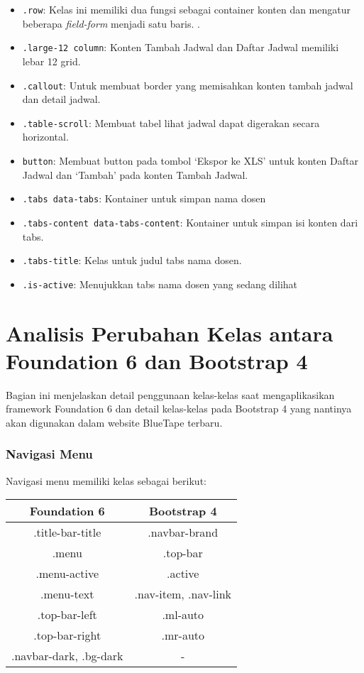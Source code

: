 \begin{itemize}
	\item \texttt{.row}: Kelas ini memiliki dua fungsi sebagai container konten dan mengatur beberapa \textit{field-form} menjadi satu baris. .
	\item \texttt{.large-12 column}: Konten Tambah Jadwal dan Daftar Jadwal memiliki lebar 12 grid.
	\item \texttt{.callout}: Untuk membuat border yang memisahkan konten tambah jadwal dan detail jadwal.
	\item \texttt{.table-scroll}: Membuat tabel lihat jadwal dapat digerakan secara horizontal.
	\item \texttt{button}: Membuat button pada tombol `Ekspor ke XLS' untuk konten Daftar Jadwal dan `Tambah' pada konten Tambah Jadwal.	
	\item \texttt{.tabs data-tabs}: Kontainer untuk simpan nama dosen
	\item \texttt{.tabs-content data-tabs-content}: Kontainer untuk simpan isi konten dari tabs.
	\item \texttt{.tabs-title}: Kelas untuk judul tabs nama dosen.
	\item \texttt{.is-active}: Menujukkan tabs nama dosen yang sedang dilihat
\end{itemize}

\section{Analisis Perubahan Kelas antara Foundation 6 dan Bootstrap 4}
Bagian ini menjelaskan detail penggunaan kelas-kelas saat mengaplikasikan framework Foundation 6 dan detail kelas-kelas pada Bootstrap 4 yang nantinya akan digunakan dalam website BlueTape terbaru.

\subsubsection{Navigasi Menu}
Navigasi menu memiliki kelas sebagai berikut: \\
\begin{tabular}{|c|c|} 
	\hline
	\textbf{Foundation 6} & \textbf{Bootstrap 4}  \\ [0.5ex] 
	\hline\hline
	.title-bar-title & .navbar-brand  \\ 
	\hline
	.menu & .top-bar  \\
	\hline
	.menu-active & .active  \\
	\hline	
	.menu-text & .nav-item, .nav-link \\
	\hline	
	.top-bar-left & .ml-auto  \\
	\hline
	.top-bar-right & .mr-auto  \\
	\hline
	.navbar-dark, .bg-dark & -  \\ [1ex] 
	\hline
\end{tabular}
